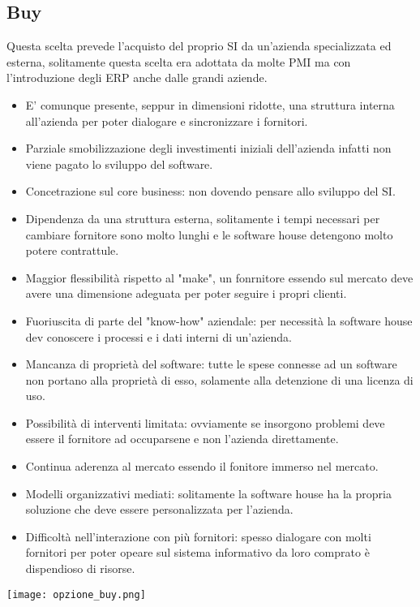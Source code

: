\documentclass[../main.tex]{subfiles}
\begin{document}
	\subsection{Buy}
	Questa scelta prevede l'acquisto del proprio SI da un'azienda specializzata ed esterna, solitamente questa scelta era adottata da molte PMI ma con l'introduzione degli ERP anche dalle grandi aziende.
	\begin{itemize}
		\item E' comunque presente, seppur in dimensioni ridotte, una struttura interna all'azienda per poter dialogare e sincronizzare i fornitori.
		\item Parziale smobilizzazione degli investimenti iniziali dell'azienda infatti non viene pagato lo sviluppo del software.
		\item Concetrazione sul core business: non dovendo pensare allo sviluppo del SI.
		\item Dipendenza da una struttura esterna, solitamente i tempi necessari per cambiare fornitore sono molto lunghi e le software house detengono molto potere contrattule.
		\item Maggior flessibilità rispetto al "make", un fonrnitore essendo sul mercato deve avere una dimensione adeguata per poter seguire i propri clienti.
		\item Fuoriuscita di parte del "know-how" aziendale: per necessità la software house dev conoscere i processi e i dati interni di un'azienda.
		\item Mancanza di proprietà del software: tutte le spese connesse ad un software non portano alla proprietà di esso, solamente alla detenzione di una licenza di uso.
		\item Possibilità di interventi limitata: ovviamente se insorgono problemi deve essere il fornitore ad occuparsene e non l'azienda direttamente.
		\item Continua aderenza al mercato essendo il fonitore immerso nel mercato.
		\item Modelli organizzativi mediati: solitamente la software house ha la propria soluzione che deve essere personalizzata per l'azienda.
		\item Difficoltà nell'interazione con più fornitori: spesso dialogare con molti fornitori per poter opeare sul sistema informativo da loro comprato è dispendioso di risorse.
	\end{itemize}
	\begin{center}
		\texttt{[image: opzione\_buy.png]}
	\end{center}
	
\end{document}

